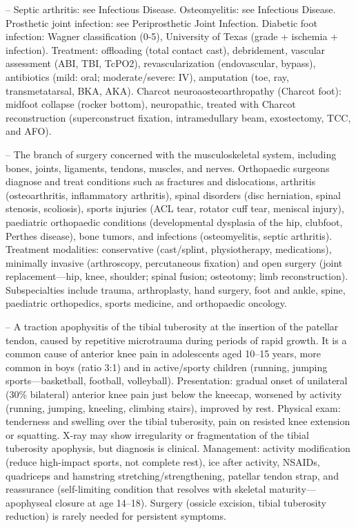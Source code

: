 -- Septic arthritis: see Infectious Disease. Osteomyelitis: see Infectious Disease. Prosthetic joint infection: see Periprosthetic Joint Infection. Diabetic foot infection: Wagner classification (0-5), University of Texas (grade + ischemia + infection). Treatment: offloading (total contact cast), debridement, vascular assessment (ABI, TBI, TcPO2), revascularization (endovascular, bypass), antibiotics (mild: oral; moderate/severe: IV), amputation (toe, ray, transmetatarsal, BKA, AKA). Charcot neuroaosteoarthropathy (Charcot foot): midfoot collapse (rocker bottom), neuropathic, treated with Charcot reconstruction (superconstruct fixation, intramedullary beam, exostectomy, TCC, and AFO).

-- The branch of surgery concerned with the musculoskeletal system, including bones, joints, ligaments, tendons, muscles, and nerves. Orthopaedic surgeons diagnose and treat conditions such as fractures and dislocations, arthritis (osteoarthritis, inflammatory arthritis), spinal disorders (disc herniation, spinal stenosis, scoliosis), sports injuries (ACL tear, rotator cuff tear, meniscal injury), paediatric orthopaedic conditions (developmental dysplasia of the hip, clubfoot, Perthes disease), bone tumors, and infections (osteomyelitis, septic arthritis). Treatment modalities: conservative (cast/splint, physiotherapy, medications), minimally invasive (arthroscopy, percutaneous fixation) and open surgery (joint replacement—hip, knee, shoulder; spinal fusion; osteotomy; limb reconstruction). Subspecialties include trauma, arthroplasty, hand surgery, foot and ankle, spine, paediatric orthopedics, sports medicine, and orthopaedic oncology.

-- A traction apophysitis of the tibial tuberosity at the insertion of the patellar tendon, caused by repetitive microtrauma during periods of rapid growth. It is a common cause of anterior knee pain in adolescents aged 10--15 years, more common in boys (ratio 3:1) and in active/sporty children (running, jumping sports—basketball, football, volleyball). Presentation: gradual onset of unilateral (30\% bilateral) anterior knee pain just below the kneecap, worsened by activity (running, jumping, kneeling, climbing stairs), improved by rest. Physical exam: tenderness and swelling over the tibial tuberosity, pain on resisted knee extension or squatting. X-ray may show irregularity or fragmentation of the tibial tuberosity apophysis, but diagnosis is clinical. Management: activity modification (reduce high-impact sports, not complete rest), ice after activity, NSAIDs, quadriceps and hamstring stretching/strengthening, patellar tendon strap, and reassurance (self-limiting condition that resolves with skeletal maturity—apophyseal closure at age 14--18). Surgery (ossicle excision, tibial tuberosity reduction) is rarely needed for persistent symptoms.

